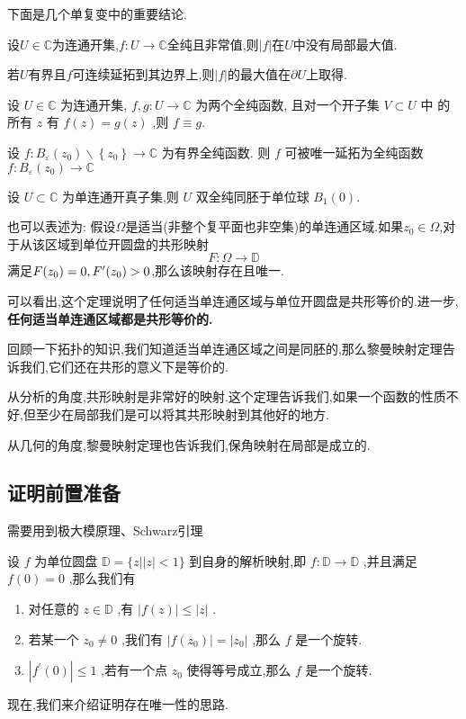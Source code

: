 下面是几个单复变中的重要结论.
\begin{theorem}
  设$U\in \mathbb{C}$为连通开集,$f\colon U\to \mathbb{C}$全纯且非常值,则$|f|$在$U$中没有局部最大值.

  若$U$有界且$f$可连续延拓到其边界上,则$|f|$的最大值在$\partial U$上取得.
\end{theorem}
\begin{theorem}
  设 $U \in \mathbb{C}$ 为连通开集, $f, g: U \rightarrow \mathbb{C}$ 为两个全纯函数, 且对一个开子集 $V \subset U$ 中 的所有 $z$ 有 $f(z)=g(z)$ ,则 $f \equiv g$.
\end{theorem}
\begin{theorem}
  设 $f: B_{\varepsilon}\left(z_{0}\right) \backslash\left\{z_{0}\right\} \rightarrow \mathbb{C}$ 为有界全纯函数. 则 $f$ 可被唯一延拓为全纯函数 $f: B_{\varepsilon}\left(z_{0}\right) \rightarrow \mathbb{C}$
\end{theorem}
\begin{theorem}
  设 $U \subset \mathbb{C}$ 为单连通开真子集,则 $U$ 双全纯同胚于单位球 $B_{1}(0)$.


  也可以表述为:\;
  假设$\Omega$是适当(非整个复平面也非空集)的单连通区域.如果$z_0\in \Omega$,对于从该区域到单位开圆盘的共形映射
\[
  F\colon \Omega \to \mathbb{D}
\]
满足$F(z_0)=0,F^\prime (z_0)>0$,那么该映射存在且唯一.
\end{theorem}
可以看出,这个定理说明了任何适当单连通区域与单位开圆盘是共形等价的.进一步,\textbf{任何适当单连通区域都是共形等价的.}


回顾一下拓扑的知识,我们知道适当单连通区域之间是同胚的,那么黎曼映射定理告诉我们,它们还在共形的意义下是等价的.


从分析的角度,共形映射是非常好的映射.这个定理告诉我们,如果一个函数的性质不好,但至少在局部我们是可以将其共形映射到其他好的地方.


从几何的角度,黎曼映射定理也告诉我们,保角映射在局部是成立的.
\subsection{证明前置准备}
需要用到极大模原理、Schwarz引理
\begin{lemma}
设 $f$ 为单位圆盘 $\mathbb{D}=\{z|| z \mid<1\}$ 到自身的解析映射,即 $f: \mathbb{D} \rightarrow \mathbb{D}$ ,并且满足 $f(0)=0$ ,那么我们有
\begin{enumerate}
  \item 对任意的 $z \in \mathbb{D}$ ,有 $|f(z)| \leq|z|$ .
  \item  若某一个 $z_{0} \neq 0$ ,我们有 $\left|f\left(z_{0}\right)\right|=\left|z_{0}\right|$ ,那么 $f$ 是一个旋转.
  \item  $\left|f^{\prime}(0)\right| \leq 1$ ,若有一个点 $z_{0}$ 使得等号成立,那么 $f$ 是一个旋转.
\end{enumerate}
\end{lemma}
现在,我们来介绍证明存在唯一性的思路.

